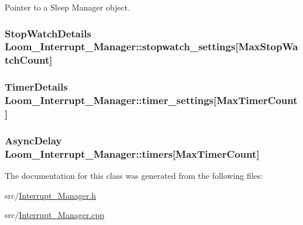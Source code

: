 Pointer to a Sleep Manager object. 

\subsubsection[{\texorpdfstring{stopwatch\+\_\+settings}{stopwatch_settings}}]{\setlength{\rightskip}{0pt plus 5cm}Stop\+Watch\+Details Loom\+\_\+\+Interrupt\+\_\+\+Manager\+::stopwatch\+\_\+settings\mbox{[}{\bf Max\+Stop\+Watch\+Count}\mbox{]}\hspace{0.3cm}{\ttfamily [protected]}}\hypertarget{class_loom___interrupt___manager_a70c3fa86880738c1090071003b76cdc5}{}\label{class_loom___interrupt___manager_a70c3fa86880738c1090071003b76cdc5}
\subsubsection[{\texorpdfstring{timer\+\_\+settings}{timer_settings}}]{\setlength{\rightskip}{0pt plus 5cm}Timer\+Details Loom\+\_\+\+Interrupt\+\_\+\+Manager\+::timer\+\_\+settings\mbox{[}{\bf Max\+Timer\+Count}\mbox{]}\hspace{0.3cm}{\ttfamily [protected]}}\hypertarget{class_loom___interrupt___manager_a77b5bb21e151ca476b9e9cf8e45eaad6}{}\label{class_loom___interrupt___manager_a77b5bb21e151ca476b9e9cf8e45eaad6}
\subsubsection[{\texorpdfstring{timers}{timers}}]{\setlength{\rightskip}{0pt plus 5cm}Async\+Delay Loom\+\_\+\+Interrupt\+\_\+\+Manager\+::timers\mbox{[}{\bf Max\+Timer\+Count}\mbox{]}\hspace{0.3cm}{\ttfamily [protected]}}\hypertarget{class_loom___interrupt___manager_aee0fc09dd7023b4d740932bb44a705c4}{}\label{class_loom___interrupt___manager_aee0fc09dd7023b4d740932bb44a705c4}


The documentation for this class was generated from the following files\+:\begin{DoxyCompactItemize}
\item 
src/\hyperlink{_interrupt___manager_8h}{Interrupt\+\_\+\+Manager.\+h}\item 
src/\hyperlink{_interrupt___manager_8cpp}{Interrupt\+\_\+\+Manager.\+cpp}\end{DoxyCompactItemize}
